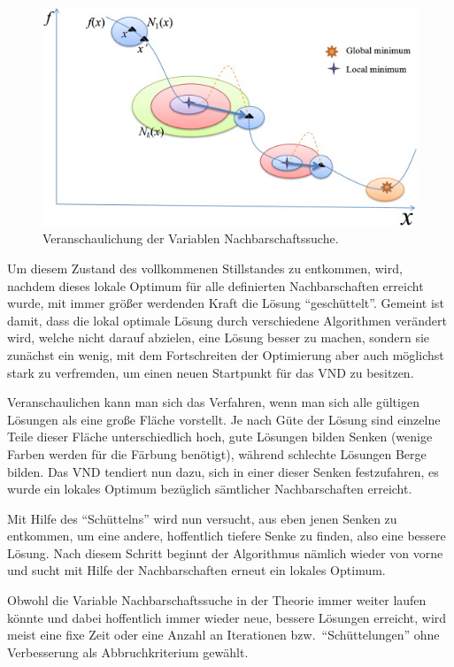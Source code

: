 \documentclass[paper=a4,fontsize=12pt]{scrartcl}
\begin{document}
{\begin{figure}
\begin{center}
\includegraphics{../img/vns.jpg}
\end{center}
\caption{Veranschaulichung der Variablen Nachbarschaftssuche. \cite{Chen}}
\end{figure}

Um diesem Zustand des vollkommenen Stillstandes zu entkommen, wird, nachdem dieses lokale Optimum für alle definierten Nachbarschaften erreicht wurde, mit immer größer werdenden Kraft die Lösung ``geschüttelt''. Gemeint ist damit, dass die lokal optimale Lösung durch verschiedene Algorithmen verändert wird, welche nicht darauf abzielen, eine Lösung besser zu machen, sondern sie zunächst ein wenig, mit dem Fortschreiten der Optimierung aber auch möglichst stark zu verfremden, um einen neuen Startpunkt für das VND zu besitzen.

Veranschaulichen kann man sich das Verfahren, wenn man sich alle gültigen Lösungen als eine große Fläche vorstellt. Je nach Güte der Lösung sind einzelne Teile dieser Fläche unterschiedlich hoch, gute Lösungen bilden Senken (wenige Farben werden für die Färbung benötigt), während schlechte Lösungen Berge bilden. Das VND tendiert nun dazu, sich in einer dieser Senken festzufahren, es wurde ein lokales Optimum bezüglich sämtlicher Nachbarschaften erreicht.

Mit Hilfe des ``Schüttelns'' wird nun versucht, aus eben jenen Senken zu entkommen, um eine andere, hoffentlich tiefere Senke zu finden, also eine bessere Lösung. Nach diesem Schritt beginnt der Algorithmus nämlich wieder von vorne und sucht mit Hilfe der Nachbarschaften erneut ein lokales Optimum.

Obwohl die Variable Nachbarschaftssuche in der Theorie immer weiter laufen könnte und dabei hoffentlich immer wieder neue, bessere Lösungen erreicht, wird meist eine fixe Zeit oder eine Anzahl an Iterationen bzw.\ ``Schüttelungen'' ohne Verbesserung als Abbruchkriterium gewählt.

}
\end{document}
